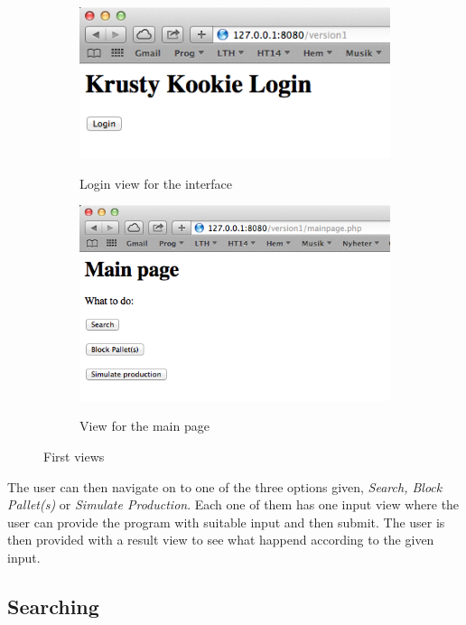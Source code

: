 \documentclass[a4paper]{scrartcl}
\numberwithin{equation}{section}
\begin{document}
\begin{figure}[h!]
  \centering
  	\begin{subfigure}[b]{0.45\textwidth}
    	\includegraphics[width=\textwidth]{figures/view_login.png}
    	\label{figure:view_login}
    	\caption{Login view for the interface}
 		\end{subfigure}	
 		\begin{subfigure}[b]{0.45\textwidth}
    	\includegraphics[width=\textwidth]{figures/view_mainpage.png}
    	\label{figure:view_mainpage}
    	\caption{View for the main page}
 		\end{subfigure} 
 		\caption{First views}
\end{figure}

The user can then navigate on to one of the three options given, \emph{Search, Block Pallet(s)} or \emph{Simulate Production}. Each one of them has one input view where the user can provide the program with suitable input and then submit. The user is then provided with a result view to see what happend according to the given input.

\subsection*{Searching}
\end{document}

